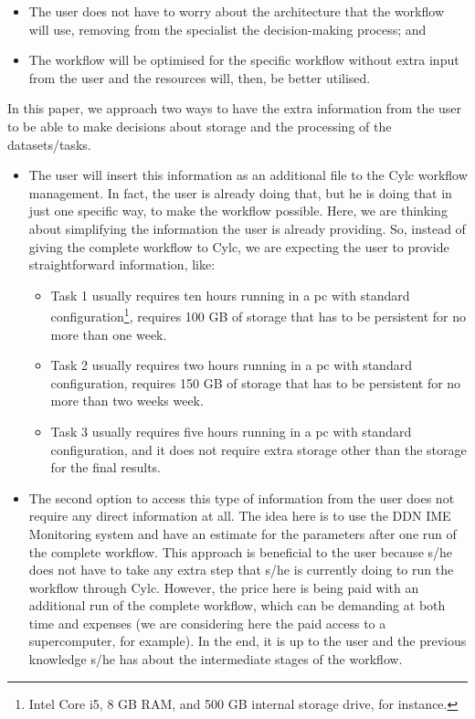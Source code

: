 \documentclass[a4paper]{article}
\begin{document}
{{{{\begin{itemize}

\item The user does not have to worry about the architecture that the workflow will use, removing from the specialist the decision-making process; and

\item The workflow will be optimised for the specific workflow without extra input from the user and the resources will, then, be better utilised.

\end{itemize}

In this paper, we approach two ways to have the extra information from the user to be able to make decisions about storage and the processing of the datasets/tasks.

\begin{itemize}

\item The user will insert this information as an additional file to the Cylc workflow management. In fact, the user is already doing that, but he is doing that in just one specific way, to make the workflow possible. Here, we are thinking about simplifying the information the user is already providing. So, instead of giving the complete workflow to Cylc, we are expecting the user to provide straightforward information, like:

\begin{itemize}

\item Task 1 usually requires ten hours running in a pc with standard configuration\footnote{Intel Core i5, 8 GB RAM, and 500 GB internal storage drive, for instance.}, requires 100 GB of storage that has to be persistent for no more than one week.

\item Task 2 usually requires two hours running in a pc with standard configuration, requires 150 GB of storage that has to be persistent for no more than two weeks week.

\item Task 3 usually requires five hours running in a pc with standard configuration, and it does not require extra storage other than the storage for the final results.

\end{itemize}

\item The second option to access this type of information from the user does not require any direct information at all. The idea here is to use the DDN IME Monitoring system and have an estimate for the parameters after one run of the complete workflow. This approach is beneficial to the user because s/he does not have to take any extra step that s/he is currently doing to run the workflow through Cylc. However, the price here is being paid with an additional run of the complete workflow, which can be demanding at both time and expenses (we are considering here the paid access to a supercomputer, for example). In the end, it is up to the user and the previous knowledge s/he has about the intermediate stages of the workflow.


\end{itemize}}}}}
\end{document}
